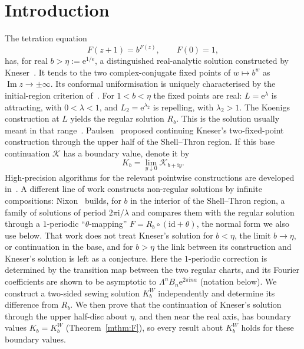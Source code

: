 \documentclass[11pt]{amsart}
\theoremstyle{definition}
\newcommand{\Rr}{R}
\newcommand{\Kk}{K}
\newcommand{\eee}{\mathrm{e}}
\newcommand{\ii}{\mathrm{i}}
\begin{document}
\maketitle

\section{Introduction}\label{sec:intro}

The tetration equation
\begin{equation}\label{eq:abel}
  F(z+1)=b^{F(z)},\qquad F(0)=1,
\end{equation}
has, for real $b>\eta:=\eee^{1/\eee}$, a distinguished real-analytic solution
constructed by Kneser~\cite{Kneser1950}.  It tends to the two complex-conjugate
fixed points of $w\mapsto b^w$ as $\operatorname{Im}z\to\pm\infty$.
Its conformal uniformisation is uniquely characterised by the
initial-region criterion of~\cite{TrappmannKouznetsov2011}.  For
$1<b<\eta$ the fixed points are real: $L=\eee^\lambda$ is attracting, with
$0<\lambda<1$, and $L_2=\eee^{\lambda_2}$ is repelling, with $\lambda_2>1$.  The
Koenigs construction at $L$ yields the regular solution $\Rr_b$.  This is the
solution usually meant in that range~\cite{KouznetsovTrappmann2010}.
Paulsen~\cite{Paulsen2019} proposed continuing Kneser's two-fixed-point
construction through the upper half of the Shell--Thron region.  If this
base continuation $\mathcal K$ has a boundary value, denote it by
\begin{equation}\label{eq:K}
  \Kk_b=\lim_{y\downarrow0}\mathcal K_{b+\ii y}.
\end{equation}
High-precision algorithms for the relevant pointwise constructions are
developed in~\cite{Kouznetsov2009,KouznetsovTrappmann2010,KouznetsovTrappmann2012}.
A different line of work constructs non-regular solutions by infinite
compositions: Nixon~\cite{Nixon2022} builds, for $b$ in the interior of the
Shell--Thron region, a family of solutions of period $2\pi\ii/\lambda$ and
compares them with the regular solution through a $1$-periodic
``$\theta$-mapping'' $F=\Rr_b\circ(\mathrm{id}+\theta)$, the normal form we
also use below.  That work does not treat Kneser's solution for $b<\eta$, the
limit $b\to\eta$, or continuation in the base, and for $b>\eta$ the link
between its construction and Kneser's solution is left as a conjecture.
Here the $1$-periodic correction is determined by the transition map between
the two regular charts, and its Fourier coefficients are shown to be
asymptotic to $\Lambda^nB_n\eee^{2\pi\ii na}$ (notation below).
We construct a two-sided sewing solution $\Kk^W_b$ independently and
determine its difference from $\Rr_b$.  We then prove that the
continuation of Kneser's solution through the upper half-disc about
$\eta$, and then near the real axis, has boundary values $\Kk_b=\Kk^W_b$ (Theorem~\ref{mthm:F}), so every
result about $\Kk^W_b$ holds for these boundary values.
\end{document}
